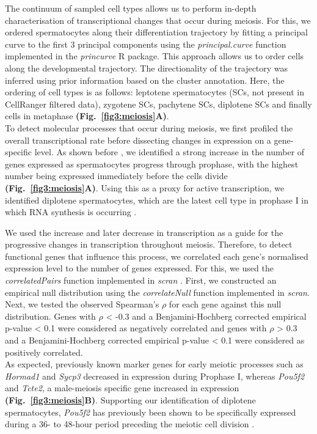 The continuum of sampled cell types allows us to perform in-depth characterisation of transcriptional changes that occur during meiosis. For this, we ordered spermatocytes along their differentiation trajectory by fitting a principal curve \citep{Hastie1989} to the first 3 principal components using the \emph{principal.curve} function implemented in the \emph{princurve} R package. This approach allows us to order cells along the developmental trajectory. The directionality of the trajectory was inferred using prior information based on the cluster annotation. Here, the ordering of cell types is as follows: leptotene spermatocytes (SCs, not present in CellRanger filtered data), zygotene SCs, pachytene SCs, diplotene SCs and finally cells in metaphase \textbf{(Fig.~\ref{fig3:meiosis}A)}. \\

To detect molecular processes that occur during meiosis, we first profiled the overall transcriptional rate before dissecting changes in expression on a gene-specific level. As shown before \citep{Xia2018}, we identified a strong increase in the number of genes expressed as spermatocytes progress through prophase, with the highest number being expressed immediately before the cells divide \textbf{(Fig.~\ref{fig3:meiosis}A)}. Using this as a proxy for active transcription, we identified diplotene spermatocytes, which are the latest cell type in prophase I in which RNA synthesis is occurring \citep{Monesi1965}. 

\newpage

We used the increase and later decrease in transcription as a guide for the progressive changes in transcription throughout meiosis. Therefore, to detect functional genes that influence this process, we correlated each gene’s normalised expression level to the number of genes expressed. For this, we used the \emph{correlatedPairs} function implemented in \emph{scran} \citep{Lun2016}. First, we constructed an empirical null distribution using the \emph{correlateNull} function implemented in \emph{scran}. Next, we tested the observed Spearman’s $\rho$ for each gene against this null distribution. Genes with $\rho$ < -0.3 and a Benjamini-Hochberg corrected empirical p-value < 0.1 were considered as negatively correlated and genes with $\rho$ > 0.3 and a Benjamini-Hochberg corrected empirical p-value < 0.1 were considered as positively correlated.\\

As expected, previously known marker genes for early meiotic processes such as \textit{Hormad1} and \textit{Sycp3} decreased in expression during Prophase I, whereas \textit{Pou5f2} and \textit{Tcte2}, a male-meiosis specific gene \citep{Braidotti1997} increased in expression \textbf{(Fig.~\ref{fig3:meiosis}B)}. Supporting our identification of diplotene spermatocytes, \textit{Pou5f2} has previously been shown to be specifically expressed during a 36- to 48-hour period preceding the meiotic cell division \citep{Andersen1993}. \\

